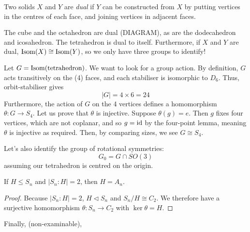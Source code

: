 \documentclass{../../template/note}
\begin{document}
    \begin{definition}
        Two solids \(X\) and \(Y\) are \emph{dual} if \(Y\) can be constructed from \(X\) by putting vertices in the centres of each face, and joining vertices in adjacent faces.
    \end{definition}
    
    The cube and the octahedron are dual (DIAGRAM), as are the dodecahedron and icosahedron. The tetrahedron is dual to itself. Furthermore, if \(X\) and \(Y\) are dual, \(\operatorname{Isom}(X) \cong \operatorname{Isom}(Y)\), so we only have three groups to identify!
    
    \begin{example}[Tetrahedron]
        Let \(G = \operatorname{Isom}(\text{tetrahedron})\). We want to look for a group action. By definition, \(G\) acts transitively on the (4) faces, and each stabiliser is isomorphic to \(D_6\). Thus, orbit-stabiliser gives
        \[
            |G| = 4 \times 6 = 24
        \]
        Furthermore, the action of \(G\) on the 4 vertices defines a homomorphism \(\theta: G \to S_4\). Let us prove that \(\theta\) is injective. Suppose \(\theta(g) = e\). Then \(g\) fixes four vertices, which are not coplanar, and so \(g = \operatorname{id}\) by the four-point lemma, meaning \(\theta\) is injective as required. Then, by comparing sizes, we see \(G \cong S_4\).

        Let's also identify the group of rotational symmetries:
        \[
            G_0 = G \cap SO(3)
        \]
        assuming our tetrahedron is centred on the origin.
    \end{example}
    
    \begin{lemma}[Uniqueness of \(A_n\)]
        If \(H \leq S_n\) and \(|S_n:H|=2\), then \(H=A_n\).
    \end{lemma}
    
    \begin{proof}
        Because \(|S_n:H|=2\), \(H \triangleleft S_n\) and \(S_n/H \cong C_2\). We therefore have a surjective homomorphism \(\theta: S_n \to C_2\) with \(\ker \theta = H\).
    \end{proof}
    

    Finally, (non-examinable), 
\end{document}
